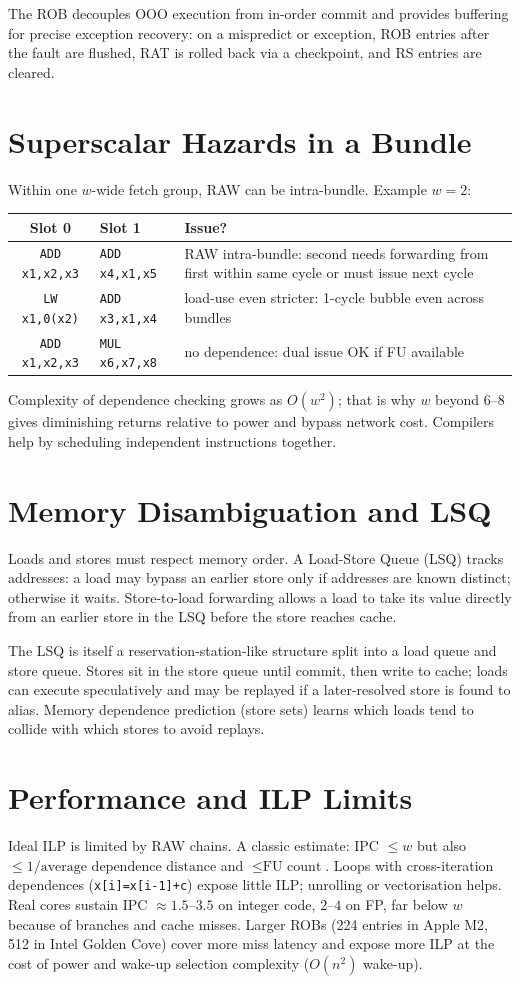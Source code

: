 The ROB decouples OOO execution from in-order commit and provides buffering for precise exception recovery: on a mispredict or exception, ROB entries after the fault are flushed, RAT is rolled back via a checkpoint, and RS entries are cleared.

\section{Superscalar Hazards in a Bundle}
Within one $w$-wide fetch group, RAW can be intra-bundle. Example $w=2$:
\begin{center}
\begin{tabular}{clp{6.2cm}}
\toprule Slot 0 & Slot 1 & Issue? \\ \midrule
\texttt{ADD x1,x2,x3} & \texttt{ADD x4,x1,x5} & RAW intra-bundle: second needs forwarding from first within same cycle or must issue next cycle \\
\texttt{LW x1,0(x2)} & \texttt{ADD x3,x1,x4} & load-use even stricter: 1-cycle bubble even across bundles \\
\texttt{ADD x1,x2,x3} & \texttt{MUL x6,x7,x8} & no dependence: dual issue OK if FU available \\ \bottomrule
\end{tabular}
\end{center}
Complexity of dependence checking grows as $O(w^2)$; that is why $w$ beyond 6--8 gives diminishing returns relative to power and bypass network cost. Compilers help by scheduling independent instructions together.

\section{Memory Disambiguation and LSQ}
Loads and stores must respect memory order. A Load-Store Queue (LSQ) tracks addresses: a load may bypass an earlier store only if addresses are known distinct; otherwise it waits. Store-to-load forwarding allows a load to take its value directly from an earlier store in the LSQ before the store reaches cache.

The LSQ is itself a reservation-station-like structure split into a load queue and store queue. Stores sit in the store queue until commit, then write to cache; loads can execute speculatively and may be replayed if a later-resolved store is found to alias. Memory dependence prediction (store sets) learns which loads tend to collide with which stores to avoid replays.

\section{Performance and ILP Limits}
Ideal ILP is limited by RAW chains. A classic estimate: IPC $\le w$ but also $\le 1/\text{average dependence distance}$ and $\le \text{FU count}$. Loops with cross-iteration dependences (\texttt{x[i]=x[i-1]+c}) expose little ILP; unrolling or vectorisation helps. Real cores sustain IPC $\approx 1.5$--$3.5$ on integer code, $2$--$4$ on FP, far below $w$ because of branches and cache misses. Larger ROBs (224 entries in Apple M2, 512 in Intel Golden Cove) cover more miss latency and expose more ILP at the cost of power and wake-up selection complexity ($O(n^2)$ wake-up).

